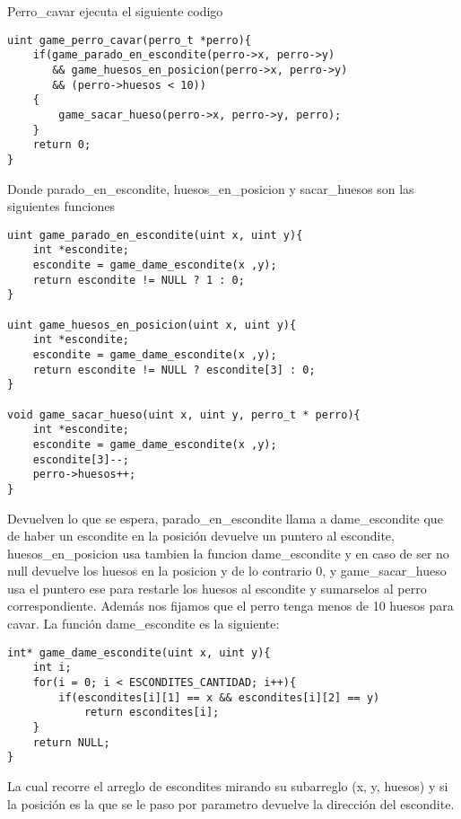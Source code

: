 Perro\_cavar ejecuta el siguiente codigo

\begin{codesnippet}
\begin{verbatim}
uint game_perro_cavar(perro_t *perro){
    if(game_parado_en_escondite(perro->x, perro->y) 
       && game_huesos_en_posicion(perro->x, perro->y) 
       && (perro->huesos < 10))
    {
        game_sacar_hueso(perro->x, perro->y, perro);
    }
    return 0;
}
\end{verbatim}
\end{codesnippet}

Donde parado\_en\_escondite, huesos\_en\_posicion y sacar\_huesos son las siguientes funciones

\begin{codesnippet}
\begin{verbatim}
uint game_parado_en_escondite(uint x, uint y){
    int *escondite;
    escondite = game_dame_escondite(x ,y);
    return escondite != NULL ? 1 : 0;
}

uint game_huesos_en_posicion(uint x, uint y){
    int *escondite;
    escondite = game_dame_escondite(x ,y);
    return escondite != NULL ? escondite[3] : 0;
}

void game_sacar_hueso(uint x, uint y, perro_t * perro){
    int *escondite;
    escondite = game_dame_escondite(x ,y);
    escondite[3]--;
    perro->huesos++;
}
\end{verbatim}
\end{codesnippet}

Devuelven lo que se espera, parado\_en\_escondite llama a dame\_escondite que de haber un escondite en la posición devuelve  un puntero al escondite, huesos\_en\_posicion usa tambien la funcion dame\_escondite y en caso de ser no null devuelve los huesos en la posicion
y de lo contrario 0, y game\_sacar\_hueso usa el puntero ese para restarle los huesos al escondite y sumarselos al perro correspondiente. Además nos fijamos que el perro tenga menos de 10 huesos para cavar. La función dame\_escondite es la siguiente:

\begin{codesnippet}
\begin{verbatim}
int* game_dame_escondite(uint x, uint y){
    int i;
    for(i = 0; i < ESCONDITES_CANTIDAD; i++){
        if(escondites[i][1] == x && escondites[i][2] == y)
            return escondites[i];
    }
    return NULL;
}
\end{verbatim}
\end{codesnippet}

La cual recorre el arreglo de escondites mirando su subarreglo (x, y, huesos) y si la posición es la que se le paso por parametro devuelve la dirección del escondite.
